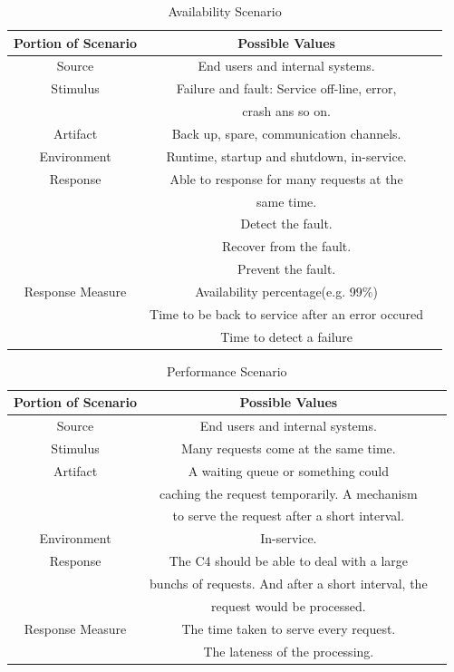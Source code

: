 \documentclass{article}
\begin{document}
	\begin{center}
		\begin{table}[!htb]
		\begin{tabular}{ccc}
		\toprule  
		Portion of Scenario & Possible Values\\
		\midrule 
		Source & End users and internal systems.\\
		Stimulus & Failure and fault: Service off-line, error, \\
		& crash ans so on.\\
		Artifact & Back up, spare, communication channels.\\
		Environment & Runtime, startup and shutdown, in-service.\\
		Response & Able to response for many requests at the \\
		& same time.\\
		& Detect the fault. \\
		& Recover from the fault. \\
		& Prevent the fault. \\		
		Response Measure & Availability percentage(e.g. 99\%) \\
		& Time to be back to service after an error occured \\
		& Time to detect a failure \\
		\bottomrule
		\end{tabular}
		\caption{Availability Scenario}
		\end{table}
	\end{center}

	\begin{center}
		\begin{table}[!htb]
		\begin{tabular}{ccc}
		\toprule  
		Portion of Scenario & Possible Values\\
		\midrule 
		Source & End users and internal systems.\\
		Stimulus & Many requests come at the same time.\\
		Artifact & A waiting queue or something could  \\
		& caching the request temporarily. A mechanism  \\
		& to serve the request after a short interval.\\
		Environment & In-service. \\
		Response & The C4 should be able to deal with a large \\
		& bunchs of requests. And after a short interval, the \\
		& request would be processed.\\
		Response Measure & The time taken to serve every request.\\
		& The lateness of the processing.\\
		\bottomrule
		\end{tabular}
		\caption{Performance Scenario}
		\end{table}
	\end{center}
\end{document}
